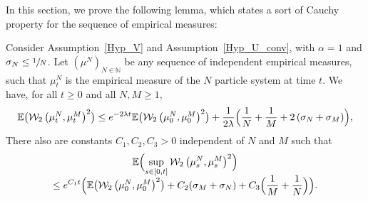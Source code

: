 In this section, we prove the following lemma, which states a sort of Cauchy property for the sequence of empirical measures:

\begin{lemma}\label{cauchy_alpha_1}
Consider Assumption~\ref{Hyp_V} and Assumption~\ref{Hyp_U_conv}, with $\alpha=1$ and $\sigma_N\leq\sfrac{1}{N}$. Let $(\mu^N)_{N\in\mathbb{N}}$ be any sequence of independent empirical measures, such that $\mu_t^N$ is the empirical measure of the $N$ particle system at time $t$. We have, for all $t\geq0$ and all $N,M\geq 1$,
\begin{equation}\label{unif_sans_sup}
\mathbb{E}\bigl(\mathcal{W}_2\left(\mu_t^N,\mu_t^M\right)^2\bigr)\leq e^{-2\lambda t}\mathbb{E}\bigl(\mathcal{W}_2\left(\mu_0^N,\mu_0^M\right)^2\bigr)+\frac{1}{2\lambda}\Bigl(\frac{1}{N}+\frac{1}{M}+2\left(\sigma_N+\sigma_M\right)\Bigr),
\end{equation}
There also are constants $C_1, C_2, C_3>0$ independent of $N$ and $M$ such that
\begin{multline}
\mathbb{E}\Bigl(\sup_{s\in[0,t]}\mathcal{W}_2\left(\mu_s^N,\mu_s^M\right)^2\Bigr)\\[-5pt]
\leq e^{C_1t}\Bigl(\mathbb{E}\bigl(\mathcal{W}_2\left(\mu_0^N,\mu_0^M\right)^2\bigr)+C_2(\sigma_M+\sigma_N)
+C_3\Bigl(\frac{1}{M}+\frac{1}{N}\Bigr)\Bigr).\label{non_unif_avec_sup}
\end{multline}
\end{lemma}

